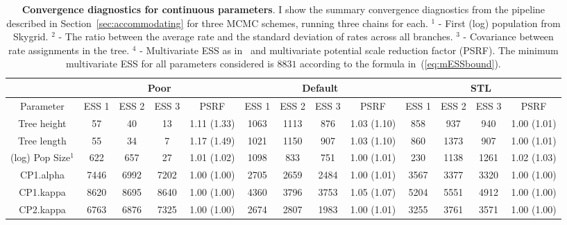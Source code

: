 \begin{sidewaystable}[!ht]
\caption[Convergence diagnostics for continuous parameters.]{\textbf{Convergence diagnostics for continuous parameters}.
I show the summary convergence diagnostics from the pipeline described in Section~\ref{sec:accommodating} for three MCMC schemes, running three chains for each.
$^1$ - First (log) population  from Skygrid.
$^2$ - The ratio between the average rate and the standard deviation of rates across all branches.
$^3$ - Covariance between rate assignments in the tree.
$^4$ - Multivariate ESS as in~\cite{Vats2015} and multivariate potential scale reduction factor (PSRF).
The minimum multivariate ESS for all parameters considered is $8831$ according to the formula in~(\ref{eq:mESSbound}).
}
\label{tab:continuous_results}
\begin{center}
\small\addtolength{\tabcolsep}{-5pt}
 \begin{tabular}{ccccc|cccc|cccc}
\toprule
                         & \multicolumn{4}{c}{Poor}                  & \multicolumn{4}{c}{Default}               & \multicolumn{4}{c}{STL}                   \\
\midrule                         
Parameter                & ESS 1 & ESS 2 & ESS 3 & PSRF        & ESS 1 & ESS 2 & ESS 3 & PSRF        & ESS 1 & ESS 2 & ESS 3 & PSRF        \\
\midrule
Tree height              & 57      & 40      & 13      & 1.11 (1.33) & 1063    & 1113    & 876     & 1.03 (1.10) & 858     & 937     & 940     & 1.00 (1.01) \\
Tree length              & 55      & 34      & 7       & 1.17 (1.49) & 1021    & 1150    & 907     & 1.03 (1.10) & 860     & 1373    & 907     & 1.00 (1.01) \\
(log) Pop Size$^1$           & 622     & 657     & 27      & 1.01 (1.02) & 1098    & 833     & 751     & 1.00 (1.01) & 230     & 1138    & 1261    & 1.02 (1.03) \\
CP1.alpha                & 7446    & 6992    & 7202    & 1.00 (1.00) & 2705    & 2659    & 2484    & 1.00 (1.01) & 3567    & 3377    & 3320    & 1.00 (1.00) \\
CP1.kappa                & 8620    & 8695    & 8640    & 1.00 (1.00) & 4360    & 3796    & 3753    & 1.05 (1.07) & 5204    & 5551    & 4912    & 1.00 (1.00) \\
CP2.kappa                & 6763    & 6876    & 7325    & 1.00 (1.00) & 2674    & 2807    & 1983    & 1.00 (1.01) & 3255    & 3761    & 3571    & 1.00 (1.00) \\

\end{tabular}
\end{center}
\end{sidewaystable}
